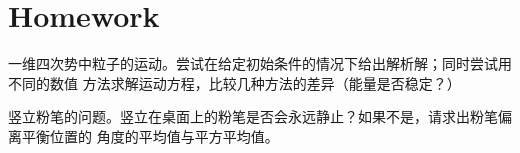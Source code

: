     \section{Homework}
    \begin{asg}
        一维四次势中粒子的运动。尝试在给定初始条件的情况下给出解析解；同时尝试用不同的数值
        方法求解运动方程，比较几种方法的差异（能量是否稳定？）
    \end{asg}
    \begin{asg}
        竖立粉笔的问题。竖立在桌面上的粉笔是否会永远静止？如果不是，请求出粉笔偏离平衡位置的
        角度的平均值与平方平均值。
    \end{asg}
    
    

